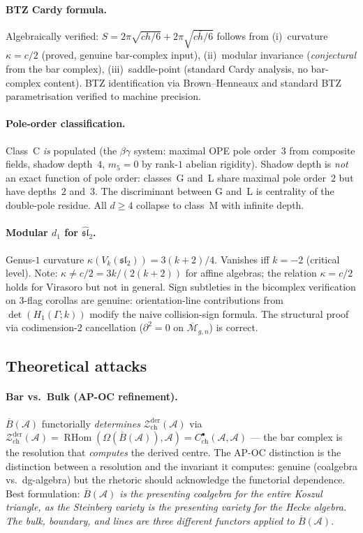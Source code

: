\documentclass[11pt]{article}
\newcommand{\cA}{\mathcal{A}}
\newcommand{\cZ}{\mathcal{Z}}
\newcommand{\barB}{\overline{B}}
\newcommand{\RHom}{\operatorname{RHom}}
\newcommand{\Zder}{\cZ^{\mathrm{der}}_{\mathrm{ch}}}
\begin{document}
\paragraph{BTZ Cardy formula.}  Algebraically verified:
$S = 2\pi\sqrt{ch/6} + 2\pi\sqrt{c\bar{h}/6}$ follows from
(i)~curvature $\kappa = c/2$ (proved, genuine bar-complex input),
(ii)~modular invariance (\emph{conjectural} from the bar complex),
(iii)~saddle-point (standard Cardy analysis, no bar-complex content).
BTZ identification via Brown--Henneaux and standard BTZ
parametrisation verified to machine precision.

\paragraph{Pole-order classification.}  Class~C \emph{is} populated
(the $\beta\gamma$ system: maximal OPE pole order~$3$ from composite
fields, shadow depth~$4$, $m_5 = 0$ by rank-$1$ abelian rigidity).
Shadow depth is \emph{not} an exact function of pole order: classes~G
and~L share maximal pole order~$2$ but have depths~$2$ and~$3$.
The discriminant between G and~L is centrality of the double-pole
residue.  All $d \ge 4$ collapse to class~M with infinite depth.

\paragraph{Modular $d_1$ for $\widehat{\mathfrak{sl}}_2$.}
Genus-$1$ curvature $\kappa(V_k(\mathfrak{sl}_2)) = 3(k+2)/4$.
Vanishes iff $k = -2$ (critical level).  Note:
$\kappa \ne c/2 = 3k/(2(k+2))$ for affine algebras; the relation
$\kappa = c/2$ holds for Virasoro but not in general.  Sign
subtleties in the bicomplex verification on $3$-flag corollas are
genuine: orientation-line contributions from $\det(H_1(\Gamma;k))$
modify the naive collision-sign formula.  The structural proof via
codimension-$2$ cancellation ($\partial^2 = 0$ on
$\overline{\mathcal{M}}_{g,n}$) is correct.

\subsection{Theoretical attacks}
\label{subsec:polyakov-theory}

\paragraph{Bar vs.\ Bulk (AP-OC refinement).}
$\barB(\cA)$ functorially \emph{determines} $\Zder(\cA)$ via
$\Zder(\cA) = \RHom(\Omega(\barB(\cA)), \cA) =
C^\bullet_{\mathrm{ch}}(\cA, \cA)$ --- the bar complex is the
resolution that \emph{computes} the derived centre.  The AP-OC
distinction is the distinction between a resolution and the
invariant it computes: genuine (coalgebra vs.\ dg-algebra) but the
rhetoric should acknowledge the functorial dependence.  Best
formulation: \emph{$\barB(\cA)$ is the presenting coalgebra for the
entire Koszul triangle, as the Steinberg variety is the presenting
variety for the Hecke algebra.  The bulk, boundary, and lines are
three different functors applied to $\barB(\cA)$.}
\end{document}
